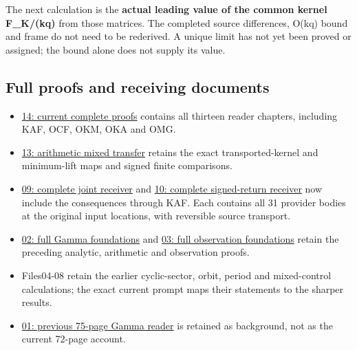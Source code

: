 \documentclass[
]{article}
\providecommand{\tightlist}{%
  \setlength{\itemsep}{0pt}\setlength{\parskip}{0pt}}
\begin{document}
The next calculation is the \textbf{actual leading value of the common
kernel F\_K/(kq)} from those matrices. The completed source differences,
O(kq) bound and frame do not need to be rederived. A unique limit has
not yet been proved or assigned; the bound alone does not supply its
value.

\subsection{Full proofs and receiving
documents}\label{full-proofs-and-receiving-documents}

\begin{itemize}
\tightlist
\item
  \href{workbenches/splitzero-tandem/continuations/20260914-original-kernel-matrices/14_CURRENT_KERNEL_AND_MULTIPLICITY_PROOFS.tex}{14:
  current complete proofs} contains all thirteen reader chapters,
  including KAF, OCF, OKM, OKA and OMG.
\item
  \href{workbenches/splitzero-tandem/continuations/20260914-original-kernel-matrices/13_ARITHMETIC_MIXED_TRANSFER.tex}{13:
  arithmetic mixed transfer} retains the exact transported-kernel and
  minimum-lift maps and signed finite comparisons.
\item
  \href{workbenches/splitzero-tandem/continuations/20260914-original-kernel-matrices/09_UPDATED_JOINT_NOTE.tex}{09:
  complete joint receiver} and
  \href{workbenches/splitzero-tandem/continuations/20260914-original-kernel-matrices/10_UPDATED_SIGNED_RETURN.tex}{10:
  complete signed-return receiver} now include the consequences through
  KAF. Each contains all 31 provider bodies at the original input
  locations, with reversible source transport.
\item
  \href{workbenches/splitzero-tandem/continuations/20260914-original-kernel-matrices/02_FULL_GAMMA_PROOFS.tex}{02:
  full Gamma foundations} and
  \href{workbenches/splitzero-tandem/continuations/20260914-original-kernel-matrices/03_FULL_OBSERVATION_PROOFS.tex}{03:
  full observation foundations} retain the preceding analytic,
  arithmetic and observation proofs.
\item
  Files04-08 retain the earlier cyclic-sector, orbit, period and
  mixed-control calculations; the exact current prompt maps their
  statements to the sharper results.
\item
  \href{workbenches/splitzero-tandem/continuations/20260914-original-kernel-matrices/01_GAMMA_READER.pdf}{01:
  previous 75-page Gamma reader} is retained as background, not as the
  current 72-page account.
\end{itemize}
\end{document}
